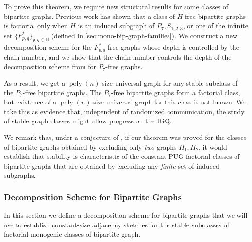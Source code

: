 \documentclass{theoretics}
\makeatletter
\DeclareMathOperator{\poly}{poly}
\newcommand{\cF}{\ensuremath{\mathcal{F}}}
\newcommand{\bN}{\ensuremath{\mathbb{N}}}
\newcommand\IfRestateTF{%
  \ifx\label\thmt@gobble@label %
    \expandafter\@firstoftwo
  \else
    \expandafter\@secondoftwo
  \fi
}
\newcommand{\RestateRemark}{\IfRestateTF{{\normalfont\bfseries (Restated) }}{}}
\makeatother
\begin{document}

To prove this theorem, we require new structural results for some classes of bipartite graphs.
Previous work \cite{All09,LZ17} has shown that a class of $H$-free bipartite graphs is factorial
only when $H$ is an induced subgraph of $P_7, S_{1,2,3}$, or one of the infinite set
$\{F^*_{p,q}\}_{p,q \in \bN}$ (defined in \cref{sec:mono-bip-graph-families}). We construct a new
decomposition scheme for the $F^*_{p,q}$-free graphs whose depth is controlled by the chain number,
and we show that the chain number controls the depth of the decomposition scheme from  \cite{LZ17} for $P_7$-free graphs.

As a result, we get a $\poly(n)$-size universal graph for any stable subclass of the $P_7$-free
bipartite graphs. The $P_7$-free bipartite graphs form a factorial class, but existence of a
$\poly(n)$-size universal graph for this class is not known.
We take this as evidence that, independent of randomized communication, the study of stable graph classes 
might allow progress on the IGQ.

We remark that, under a conjecture of \cite{LZ17}, if our theorem was proved for the classes of
bipartite graphs obtained by excluding only \emph{two} graphs $H_1,H_2$, it would establish that
stability is characteristic of the constant-PUG factorial classes of bipartite graphs that are
obtained by excluding any \emph{finite} set of induced subgraphs.


\subsubsection{Decomposition Scheme for Bipartite Graphs}

In this section we define a decomposition scheme for bipartite graphs that we will use to establish
constant-size adjacency sketches for the stable subclasses of factorial monogenic classes of bipartite graph.
\end{document}
